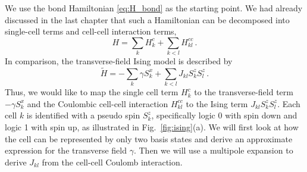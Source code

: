 We use the bond Hamiltonian \eqref{eq:H_bond} as the starting point. We had
already discussed in the last chapter that such a Hamiltonian can be decomposed
into single-cell terms and cell-cell interaction terms,
\begin{equation}
  H = \sum_k H^c_k + \sum_{k<l} H^{cc}_{kl} \, .
\end{equation}
In comparison, the transverse-field Ising model is described by
%
\begin{equation}
  \tilde{H} = - \sum_k \gamma S^x_k + \sum_{k<l} J_{kl} S^z_k S^z_l \, .
\end{equation}
%
Thus, we would like to map the single cell term $H^c_k$ to the transverse-field
term $-\gamma S^x_k$ and the Coulombic cell-cell interaction $H^{cc}_{kl}$ to
the Ising term $J_{kl} S^z_k S^z_l$. Each cell $k$ is identified with a pseudo
spin $S^z_k$, specifically logic 0 with spin down and logic 1 with spin up, as
illustrated in Fig.~\ref{fig:ising}(a). We will first look at how the 
cell can be represented by only two basis states and derive an approximate
expression for the transverse field $\gamma$. Then we will use a multipole
expansion to derive $J_{kl}$ from the cell-cell Coulomb interaction.

